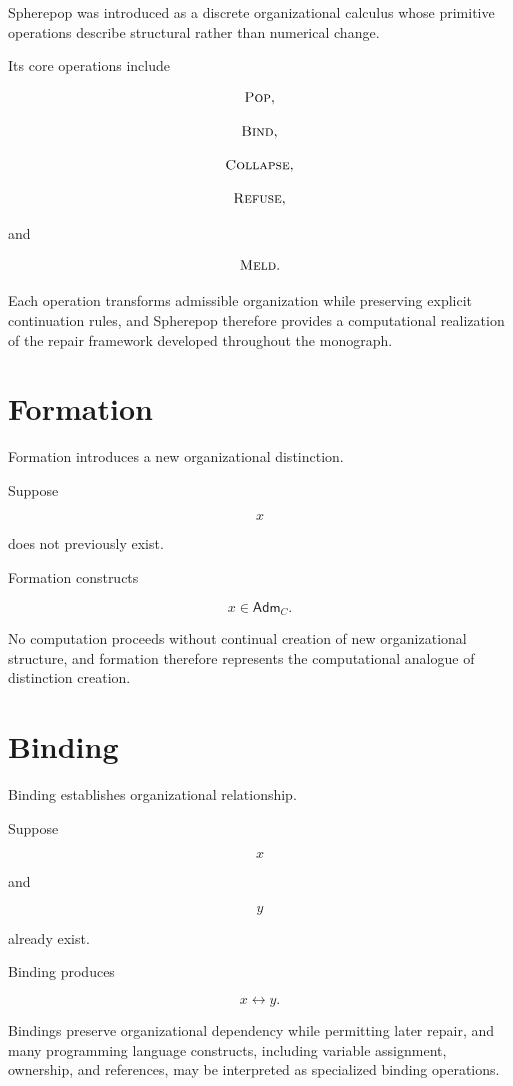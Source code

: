 \documentclass[11pt,oneside]{book}
\numberwithin{equation}{chapter}
\theoremstyle{definition}
\theoremstyle{plain}
\newcommand{\Adm}{\mathsf{Adm}}
\begin{document}
Spherepop was introduced as a discrete organizational calculus whose
primitive operations describe structural rather than numerical change.

Its core operations include

\[
\textsc{Pop},
\]

\[
\textsc{Bind},
\]

\[
\textsc{Collapse},
\]

\[
\textsc{Refuse},
\]

and

\[
\textsc{Meld}.
\]

Each operation transforms admissible organization while preserving explicit continuation rules, and Spherepop therefore provides a computational realization of the repair framework developed throughout the monograph.

\section{Formation}

Formation introduces a new organizational distinction.

Suppose

\[
x
\]

does not previously exist.

Formation constructs

\[
x
\in
\Adm_C.
\]

No computation proceeds without continual creation of new organizational structure, and formation therefore represents the computational analogue of distinction creation.

\section{Binding}

Binding establishes organizational relationship.

Suppose

\[
x
\]

and

\[
y
\]

already exist.

Binding produces

\[
x
\leftrightarrow
y.
\]

Bindings preserve organizational dependency while permitting later repair, and many programming language constructs, including variable assignment, ownership, and references, may be interpreted as specialized binding operations.
\end{document}
